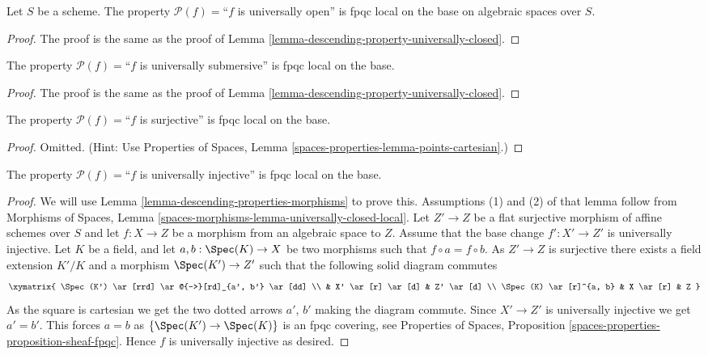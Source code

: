 \begin{lemma}
\label{lemma-descending-property-universally-open}
Let $S$ be a scheme.
The property $\mathcal{P}(f) =$``$f$ is universally open''
is fpqc local on the base on algebraic spaces over $S$.
\end{lemma}

\begin{proof}
The proof is the same as the proof of
Lemma \ref{lemma-descending-property-universally-closed}.
\end{proof}

\begin{lemma}
\label{lemma-descending-property-universally-submersive}
The property $\mathcal{P}(f) =$``$f$ is universally submersive''
is fpqc local on the base.
\end{lemma}

\begin{proof}
The proof is the same as the proof of
Lemma \ref{lemma-descending-property-universally-closed}.
\end{proof}

\begin{lemma}
\label{lemma-descending-property-surjective}
The property $\mathcal{P}(f) =$``$f$ is surjective''
is fpqc local on the base.
\end{lemma}

\begin{proof}
Omitted. (Hint: Use
Properties of Spaces, Lemma \ref{spaces-properties-lemma-points-cartesian}.)
\end{proof}

\begin{lemma}
\label{lemma-descending-property-universally-injective}
The property $\mathcal{P}(f) =$``$f$ is universally injective''
is fpqc local on the base.
\end{lemma}

\begin{proof}
We will use
Lemma \ref{lemma-descending-properties-morphisms}
to prove this. Assumptions (1) and (2) of that lemma follow from
Morphisms of Spaces,
Lemma \ref{spaces-morphisms-lemma-universally-closed-local}.
Let $Z' \to Z$ be a flat surjective morphism of affine schemes
over $S$ and let $f : X \to Z$ be a morphism from an algebraic space to $Z$.
Assume that the base change $f' : X' \to Z'$ is universally injective.
Let $K$ be a field, and let $a, b : \Spec(K) \to X$
be two morphisms such that $f \circ a = f \circ b$.
As $Z' \to Z$ is surjective there exists a field
extension $K'/K$ and a morphism
$\Spec(K') \to Z'$
such that the following solid diagram commutes
$$
\xymatrix{
\Spec(K') \ar[rrd] \ar@{-->}[rd]_{a', b'} \ar[dd] \\
 &
X' \ar[r] \ar[d] &
Z' \ar[d] \\
\Spec(K) \ar[r]^{a, b} &
X \ar[r] &
Z
}
$$
As the square is cartesian we get the two dotted arrows $a'$, $b'$ making the
diagram commute. Since $X' \to Z'$ is universally injective we get $a' = b'$.
This forces $a = b$ as $\{\Spec(K') \to \Spec(K)\}$
is an fpqc covering, see
Properties of Spaces, Proposition
\ref{spaces-properties-proposition-sheaf-fpqc}.
Hence $f$ is universally injective as desired.
\end{proof}

